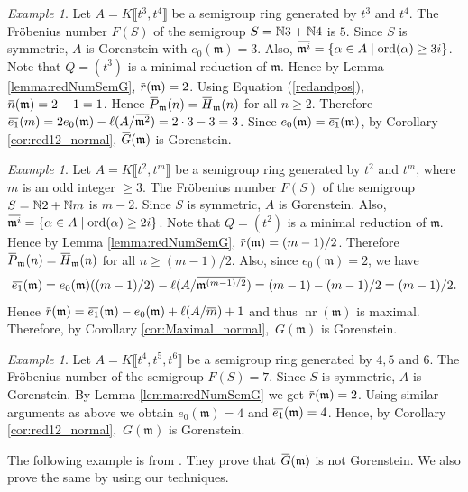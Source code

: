 \documentclass[12pt]{amsart}
\theoremstyle{definition}
\theoremstyle{remark}
\newtheorem{exam}[thm]{Example}
\numberwithin{equation}{section}
\newcommand{\m}{{\mathfrak m}}
\DeclareMathOperator{\nr}{{nr}}
\newcommand{\ol}[1]{\mkern 1.5mu\overline{\mkern-1.5mu#1\mkern-1.5mu}\mkern 1.5mu} %
\newcommand{\ols}[1]{\mskip.5\thinmuskip\overline{\mskip-.5\thinmuskip {#1} \mskip-.5\thinmuskip}\mskip.5\thinmuskip} %
\newcommand{\olsi}[1]{\,\overline{\!{#1}}} %
\begin{document}
\begin{exam}\label{Exam:3and4}
Let $A =K\llbracket t^3,t^4 \rrbracket$ be a semigroup ring generated by $t^3$ and $t^4$. 
The Fr\"obenius number $F(S)$ of the semigroup 
$S = \mathbb{N} 3 +\mathbb{N} 4$ is $5$. 
Since $S$ is symmetric, $A$ is Gorenstein with $e_0(\m)=3$. 
Also, $\ol{\m^i} = \{\alpha \in A \mid \textrm{ord}(\alpha) \geq 3i \}$.  Note that $Q = (t^3)$ is a minimal reduction of $\m$. 
Hence by Lemma \ref{lemma:redNumSemG}, $\ol{r}(\m) = 2$. 
Using Equation (\ref{redandpos}), $\ol{n}(\m) = 2-1 =1$. 
Hence $\ol{P}_{\m}(n) = \ol{H}_{\m}(n)$ for all $n \geq 2$. 
Therefore $\ol{e_1}(m)=2e_0(\m)-\ell(A/\ol{\m^2})=2 \cdot 3 -3 =3$. 
Since $e_0(\m) = \ol{e_1}(\m)$, by Corollary \ref{cor:red12_normal}, 
$\ols{G}(\m)$ is Gorenstein.
\end{exam}   

\begin{exam}\label{Exam:2andm}
Let $A =K\llbracket t^2,t^m \rrbracket$ be a semigroup ring 
generated by $t^2$ and $t^m$, where $m$ is an odd integer $\geq 3$. The Fr\"obenius number $F(S)$ of the semigroup 
$S = \mathbb{N} 2 +\mathbb{N} m$ is $m-2$. Since $S$ is symmetric, $A$ is Gorenstein. 
Also, $\ol{\m^i} = \{\alpha \in A \mid \textrm{ord}(\alpha) \geq 2i \}$.  Note that $Q = ( t^2 )$ is a minimal reduction of $\m$. 
Hence by Lemma \ref{lemma:redNumSemG}, $\ol{r}(\m) = (m-1)/2$.
Therefore $\ol{P}_{\m}(n) = \ol{H}_{\m}(n)$ for all $n \geq (m-1)/2$. 
Also, since $e_0(\m)=2$, we have 
\[
\ol{e_1}(\m) = e_0(\m)((m-1)/2)-\ell(A/\ol{\m^{(m-1)/2}})
=(m-1)-(m-1)/2=(m-1)/2. 
\]
Hence $\ol{r}(\m)= \ol{e_1}(\m) -e_0(\m) +\ell(A/\ol{m})+1$ and thus 
$\nr(\m)$ is maximal. 
Therefore, by Corollary \ref{cor:Maximal_normal}, $\olsi{G}(\m)$ is Gorenstein.
\end{exam}  

\begin{exam} \label{ex:456}
Let $A =K\llbracket t^4,t^5, t^6 \rrbracket$ be a semigroup ring 
generated by $4,5$ and $6$. 
The Fr\"obenius number of the semigroup $F(S) = 7$. 
Since $S$ is symmetric, $A$ is Gorenstein. 
By Lemma \ref{lemma:redNumSemG} we get $\ol{r}(\m) = 2$. 
Using similar arguments as above we obtain $e_0(\m) = 4$ 
and $\ol{e_1}(\m) = 4$. 
Hence, by Corollary \ref{cor:red12_normal},  
$\olsi{G}(\m)$ is Gorenstein.
\end{exam}    

\par 
The following example is from \cite[Example 7.3]{HKU}. 
They prove that $\ols{G}(\m)$ is not Gorenstein. 
We also prove the same by using our techniques.
\end{document}
